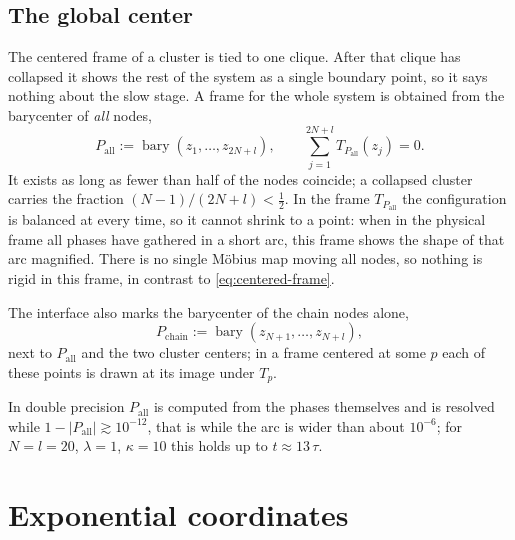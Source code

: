 \documentclass[a4paper,11pt]{article}
\newcommand{\T}{T}                       %
\newcommand{\bary}{\operatorname{bary}}
\theoremstyle{remark}
\begin{document}
\subsection{The global center}\label{sec:global}

The centered frame of a cluster is tied to one clique. After that clique has
collapsed it shows the rest of the system as a single boundary point, so it
says nothing about the slow stage. A frame for the whole system is obtained
from the barycenter of \emph{all} nodes,
\begin{equation}\label{eq:global-center}
P_{\mathrm{all}}:=\bary(z_1,\dots,z_{2N+l}),\qquad
\sum_{j=1}^{2N+l}\T_{P_{\mathrm{all}}}(z_j)=0 .
\end{equation}
It exists as long as fewer than half of the nodes coincide; a collapsed cluster
carries the fraction $(N-1)/(2N+l)<\tfrac12$. In the frame $\T_{P_{\mathrm{all}}}$
the configuration is balanced at every time, so it cannot shrink to a point:
when in the physical frame all phases have gathered in a short arc, this frame
shows the shape of that arc magnified. There is no single M\"obius map moving
all nodes, so nothing is rigid in this frame, in contrast to
\eqref{eq:centered-frame}.

The interface also marks the barycenter of the chain nodes alone,
\begin{equation}\label{eq:chain-center}
P_{\mathrm{chain}}:=\bary(z_{N+1},\dots,z_{N+l}),
\end{equation}
next to $P_{\mathrm{all}}$ and the two cluster centers; in a frame centered at
some $p$ each of these points is drawn at its image under $\T_p$.

In double precision $P_{\mathrm{all}}$ is computed from the phases themselves
and is resolved while $1-|P_{\mathrm{all}}|\gtrsim10^{-12}$, that is while the
arc is wider than about $10^{-6}$; for $N=l=20$, $\lambda=1$, $\kappa=10$ this
holds up to $t\approx13\,\tau$.

\section{Exponential coordinates}\label{sec:coordinates}
\end{document}
